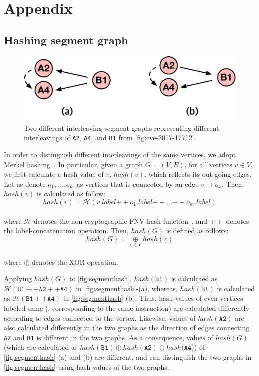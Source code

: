 \section{Appendix}


\subsection{Hashing segment graph}
\label{s:appendix:hash}

\begin{figure}[t]
  \centering
  \includegraphics[width=0.7\linewidth]{fig/segmenthash.pdf}
  \caption{Two different interleaving segment graphs representing
    different interleavings of \texttt{A2}, \texttt{A4}, and
    \texttt{B1} from \autoref{fig:cve-2017-17712}.}
  \label{fig:segmenthash}
\end{figure}
%

In order to distinguish different interleavings of the same vertices,
we adopt Merkel hashing~\cite{treehashing, treehashing2}.
%
In particular, given a graph $G = (V, E)$, for all vertices $v \in V$,
we first calculate a hash value of $v$, $hash(v)$, which reflects its
out-going edges.
%
Let us denote $o_1, ..., o_m$ as vertices that is connected by an edge
$v \rightarrow o_x$. Then, $hash(v)$ is calculated as follow:
%
%
\\
\[
  hash(v) = \mathcal{H}(v.label {++} o_1.label {++} ... {++}
  o_m.label)
\]
\\
%
where $\mathcal{H}$ denotes the non-cryptographic FNV hash
function~\cite{fnv, fnv-go}, and ${++}$ denotes the
label-concatenation operation.
%
Then, $hash(G)$ is defined as follows:
%
\\[1pt]
\[
  hash(G) = \underset{v \in V}{\oplus} hash(v)
\]
\\[1pt]
%
where $\oplus$ denotes the XOR operation.

Applying $hash(G)$ to \autoref{fig:segmenthash}, $hash(\texttt{B1})$
is calculated as
$\mathcal{H}(\texttt{B1} ++ \texttt{A2} ++ \texttt{A4})$ in
\autoref{fig:segmenthash}-(a), whereas, $hash(\texttt{B1})$ is
calculated as $\mathcal{H}(\texttt{B1} ++ \texttt{A4})$ in
\autoref{fig:segmenthash}-(b).
%
Thus, hash values of even vertices labeled same (\ie, corresponding to
the same instruction) are calculated differently according to edges
connected to the vertex.
%
Likewise, values of $hash(\texttt{A2})$ are also calculated
differently in the two graphs as the direction of edges connecting
\texttt{A2} and \texttt{B1} is different in the two graphs.
%
As a consequence, values of $hash(G)$ (which are calculated as
$hash(\texttt{B1}) \oplus hash(\texttt{A2}) \oplus hash(\texttt{A4}$))
of \autoref{fig:segmenthash}-(a) and (b) are different, and \sys can
distinguish the two graphs in \autoref{fig:segmenthash} using hash
values of the two graphs.



